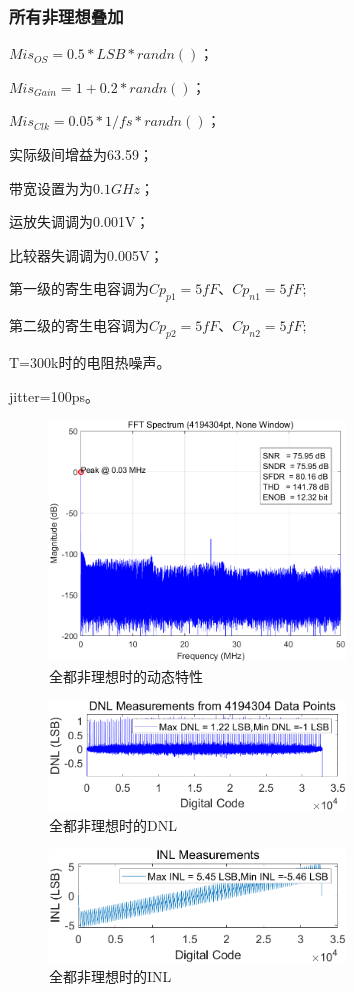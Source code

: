 \documentclass[cs4size,a4paper]{ctexart}
\numberwithin{equation}{section}
\numberwithin{table}{section}
\numberwithin{figure}{section}
\begin{document}
\subsubsection{所有非理想叠加}
$Mis_{OS} = 0.5 * LSB * randn()$；

$Mis_{Gain} = 1 + 0.2 * randn()$；

$Mis_{Clk} = 0.05 * 1/fs * randn()$；

实际级间增益为63.59；

带宽设置为为$0.1GHz$；

运放失调调为0.001V；

比较器失调调为0.005V；

第一级的寄生电容调为$Cp_{p1}  = 5fF $、$ Cp_{n1} = 5fF;$ 

第二级的寄生电容调为$Cp_{p2}  = 5fF $、$ Cp_{n2} = 5fF;$ 

T=300k时的电阻热噪声。

jitter=100ps。
		\begin{figure}[H]
			\centering
			\includegraphics[width=0.7\textwidth]{pic/noideal/DFT.png}
			\caption{全都非理想时的动态特性} 
		\end{figure}

		\begin{figure}[H]
			\centering
			\includegraphics[width=0.7\textwidth]{pic/noideal/DNL.png}
			\caption{全都非理想时的DNL} 
		\end{figure}

		\begin{figure}[H]
			\centering
			\includegraphics[width=0.7\textwidth]{pic/noideal/INL.png}
			\caption{全都非理想时的INL} 
		\end{figure}
		
\end{document}

